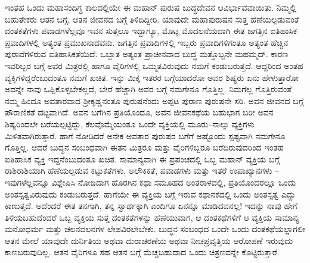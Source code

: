 ಇಂತಹ ಒಂದು ಮಹಾಸಂದಿಗ್ಧ ಕಾಲದಲ್ಲಿಯೇ ಈ ಮಹಾನ್ ಪುರುಷ ಬುದ್ಧದೇವನ ಆವಿರ್ಭಾವವಾಯಿತು. ನಿಮ್ಮಲ್ಲಿ ಬಹುತೇಕರು ಆತನ ಬಗ್ಗೆ, ಆತನ ಜೀವನದ ಬಗ್ಗೆ ತಿಳಿದಿದ್ದೀರಿ. ಯಾವುದೇ ಮಹಾಪುರುಷನ ಸುತ್ತ ಹೆಣೆಯಲ್ಪಡುವಂತೆ ದಂತಕತೆಗಳು ಪವಾಡಗಳೆಲ್ಲವೂ ಇವನ ಸುತ್ತಲೂ ಇದ್ದಾಗ್ಯೂ, ಮೊಟ್ಟ ಮೊದಲನೆಯದಾಗಿ ಈತ ಜಗತ್ತಿನ ಐತಿಹಾಸಿಕ ಪ್ರವಾದಿಗಳಲ್ಲಿ ಅತ್ಯಂತ ಪ್ರಮುಖನಾದವನು. ಜಗತ್ತಿನ ಪ್ರವಾದಿಗಳಲ್ಲಿ ಇಬ್ಬರು ಪ್ರವಾದಿಗಳಿಗಂತೂ ಅತ್ಯಂತ ಹೆಚ್ಚಿನ ಪುರಾವೆಗಳಿರುವ ಐತಿಹಾಸಿಕತೆಯಿದೆ. ಒಬ್ಬಾತ ಅತ್ಯಂತ ಪ್ರಾಚೀನವಾದ ಬುದ್ಧ ಮತ್ತೊಬ್ಬನೇ ಮಹಮ್ಮದ್. ಕಾರಣ ಇವರಿಬ್ಬರ ಬಗ್ಗೆ ಅವರ ಮಿತ್ರರಲ್ಲಿ ಹಾಗೂ ವೈರಿಗಳಲ್ಲಿ ಒಮ್ಮತವಿರುವುದು ನಮಗೆ ಕಂಡುಬರುತ್ತದೆ. ಆದ್ದರಿಂದ ಅಂತಹ ವ್ಯಕ್ತಿಗಳಿದ್ದರೆಂಬುದಂತೂ ನಮಗೆ ಖಚಿತ. ಇನ್ನು ಮಿಕ್ಕ ಇತರರ ಬಗ್ಗೆಯಾದರೋ ಅವರ ಶಿಷ್ಯರು ಏನು ಹೇಳುತ್ತಾರೋ ಅದನ್ನೇ ನಾವು ಒಪ್ಪಿಕೊಳ್ಳಬೇಕಲ್ಲದೆ, ಬೇರೆ ಹೆಚ್ಚಾಗಿ ಅವರ ಬಗ್ಗೆ ನಮಗೇನೂ ಗೊತ್ತಿಲ್ಲ. ನಿಮಗೆಲ್ಲ ಗೊತ್ತಿರುವಂತೆ ನಮ್ಮ ಹಿಂದೂ ಅವತಾರವಾದ ಶ‍್ರೀಕೃಷ್ಣನಂತೂ ಪುರುಷನೆಂದು ಅಪ್ಪಟ ಪುರಾಣ ಪುರುಷನೇ ಸರಿ. ಅವನ ಜೀವನದ ಬಗ್ಗೆ ಪೌರಾಣಿಕತೆ ದಟ್ಟವಾಗಿದೆ. ಅವನ ಬಗೆಗಿನ ಪ್ರತಿಯೊಂದೂ, ಅವನ ಜೀವನಕಥೆಯ ಬಹುಭಾಗ ಬರೀ ಅವನ ಶಿಷ್ಯರಿಂದಲೇ ಬರೆಯಲ್ಪಟ್ಟಿದ್ದು, ಕೆಲವೊಮ್ಮೆಯಂತೂ ಒಂದೇ ವ್ಯಕ್ತಿಯಲ್ಲಿ ಮೂರು–ನಾಲ್ಕು ವ್ಯಕ್ತಿಗಳು ಮಿಳಿತವಾಗಿರುತ್ತಾರೆ. ಹಾಗೆ ನೋಡಿದರೆ ಅನೇಕ ಅವತಾರ ಪುರುಷರ ಬಗೆಗೆ ಅಷ್ಟೊಂದು ಸ್ಪಷ್ಟವಾಗಿ ನಮಗೇನೂ ಗೊತ್ತಿಲ್ಲ. ಆದರೆ ಬುದ್ಧನ ಸಂಬಂಧವಾಗಿ ಈತನ ಮಿತ್ರರೂ ಮತ್ತು ವೈರಿಗಳಿಬ್ಬರೂ ಬರೆದಿರುವುದರಿಂದ ಇಂತಹ ಐತಿಹಾಸಿಕ ವ್ಯಕ್ತಿ ಇದ್ದನೆಂಬುದಂತೂ ಖಚಿತ. ಸಾಮಾನ್ಯವಾಗಿ ಈ ಪ್ರಪಂಚದಲ್ಲಿ ಒಬ್ಬ ಮಹಾನ್ ವ್ಯಕ್ತಿಯ ಬಗ್ಗೆ ರಾಶಿರಾಶಿಯಾಗಿ ಹೆಣೆಯಲ್ಪಡುವ ಕಟ್ಟುಕತೆಗಳು, ಅಲೌಕಿಕತೆ, ಪವಾಡಗಳು ಮತ್ತು ಇತರೆ ಉಪಾಖ್ಯಾನಗಳು – ಇವುಗಳೆಲ್ಲವನ್ನೂ ವಿಶ್ಲೇಷಿಸಿ ನೋಡಿದಾಗ ಹೊರಗಿನ ಕಥಾ ಸಮೂಹದ ಅಂತರಾಳದಲ್ಲಿ, ಪ್ರತಿಯೊಂದರಲ್ಲೂ ಒಂದು ಅಂತಸ್ಸತ್ವವಿರುವುದು ಕಂಡುಬರುತ್ತದೆ. ಹಾಗೆಯೇ ಈ ವ್ಯಕ್ತಿಯ ಬಗ್ಗೆ ಇರುವ ಕಥಾನಕದಲ್ಲಿ ಒಂದು ಅಂತಸ್ಸತ್ವ ಎದ್ದು ಕಾಣುತ್ತದೆ. ಅದೆಂದರೆ ಈತ ತನಗಾಗಿ, ತನ್ನ ಸ್ವಾರ್ಥಕ್ಕಾಗಿ ಎಂದಿಗೂ ಏನನ್ನೂ ಮಾಡಿದವನಲ್ಲ! ಇದನ್ನು ನಾವು ಹೇಗೆ ತಿಳಿಯಬಹುದೆಂದರೆ ಒಬ್ಬ ವ್ಯಕ್ತಿಯ ಸುತ್ತ ದಂತಕತೆಗಳನ್ನು ಹೆಣೆಯುವಾಗ, ಆ ದಂತಕಥೆಗಳಿಗೆ ಆ ವ್ಯಕ್ತಿಯ ಸಾಮಾನ್ಯ ಮನೋಧರ್ಮ ಮತ್ತು ಚಲನವಲನಗಳ ಲೇಪವಿರಲೇಬೇಕು. ಬುದ್ಧನ ಸಂಬಂಧದ ಒಂದೇ ಒಂದು ದಂತಕಥೆಯಲ್ಲಾಗಲೀ ಆತನ ಮೇಲೆ ಯಾವುದೇ ದುರ್ನಿತಿಯ ಅಥವಾ ದುರಾಚರಣೆಯ ಅಥವಾ ನೀಚಪ್ರವೃತ್ತಿಯ ಆರೋಪಣೆ ಇರುವುದು ಕಾಣಬರುವುದಿಲ್ಲ. ಆತನ ವೈರಿಗಳೂ ಸಹ ಆತನ ಬಗ್ಗೆ ಮೆಚ್ಚಬಹುದಾದ ಒಂದು ಚಿತ್ರಣವನ್ನೇ ಕೊಟ್ಟಿರುತ್ತಾರೆ.

